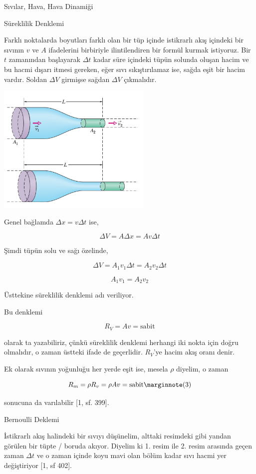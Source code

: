 \documentclass[12pt,fleqn]{article}\usepackage{../../common}
\begin{document}
Sıvılar, Hava, Hava Dinamiği

Süreklilik Denklemi

Farklı noktalarda boyutları farklı olan bir tüp içinde istikrarlı akış içindeki
bir sıvının $v$ ve $A$ ifadelerini birbiriyle ilintilendiren bir formül kurmak
istiyoruz. Bir $t$ zamanından başlayarak $\Delta t$ kadar süre içindeki tüpün
solunda oluşan hacim ve bu hacmi dışarı itmesi gereken, eğer sıvı sıkıştırılamaz
ise, sağda eşit bir hacim vardır. Soldan $\Delta V$ girmişse sağdan $\Delta V$
çıkmalıdır.

\includegraphics[width=20em]{phy_045_flight_01.png}

Genel bağlamda $\Delta x = v \Delta t$ ise,

$$
\Delta V = A \Delta x = A v \Delta t
$$

Şimdi tüpün solu ve sağı özelinde,

$$
\Delta V = A_1 v_1 \Delta t = A_2 v_2 \Delta t
$$

$$
A_1 v_1 = A_2 v_2
$$

Üsttekine süreklilik denklemi adı veriliyor.

Bu denklemi 

$$
R_V = A v = \textrm{sabit}
$$

olarak ta yazabiliriz, çünkü süreklilik denklemi herhangi iki nokta için
doğru olmalıdır, o zaman üstteki ifade de geçerlidir. $R_V$'ye hacim akış
oranı denir. 

Ek olarak sıvının yoğunluğu her yerde eşit ise, mesela $\rho$ diyelim, o
zaman 

$$
R_m = \rho R_v = \rho A v = \textrm{sabit}
\mlabel{3}
$$

sonucuna da varılabilir [1, sf. 399].


Bernoulli Deklemi

İstikrarlı akış halindeki bir sıvıyı düşünelim, alttaki resimdeki gibi
yandan görülen bir tüpte / boruda akıyor. Diyelim ki 1. resim ile 2. resim
arasında geçen zaman $\Delta t$ ve o zaman içinde koyu mavi olan bölüm
kadar sıvı hacmi yer değiştiriyor [1, sf 402].
\end{document}
